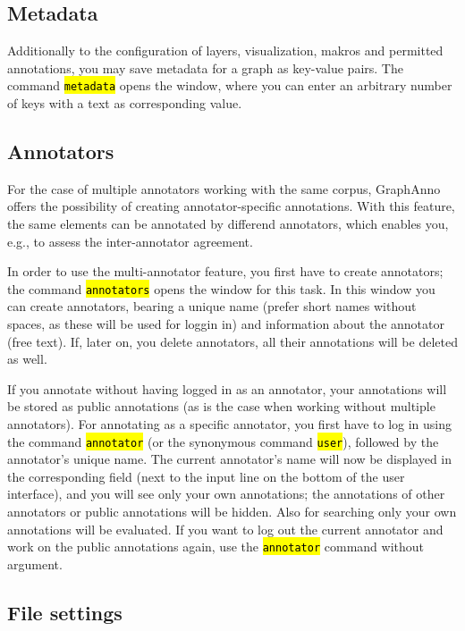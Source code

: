 \documentclass[12pt]{scrartcl}
\newcommand{\code}[1]{\hl{\texttt{#1}}}
\begin{document}
\subsection{Metadata}

Additionally to the configuration of layers, visualization, makros and permitted annotations, you may save metadata for a graph as key-value pairs.
The command \code{metadata} opens the window, where you can enter an arbitrary number of keys with a text as corresponding value.


\subsection{Annotators}\label{annotatoren}

For the case of multiple annotators working with the same corpus, GraphAnno offers the possibility of creating annotator-specific annotations.
With this feature, the same elements can be annotated by differend annotators, which enables you, e.g., to assess the inter-annotator agreement.

In order to use the multi-annotator feature, you first have to create annotators; the command \code{annotators} opens the window for this task.
In this window you can create annotators, bearing a unique name (prefer short names without spaces, as these will be used for loggin in) and information about the annotator (free text).
If, later on, you delete annotators, all their annotations will be deleted as well.

If you annotate without having logged in as an annotator, your annotations will be stored as public annotations (as is the case when working without multiple annotators).
For annotating as a specific annotator, you first have to log in using the command \code{annotator} (or the synonymous command \code{user}), followed by the annotator’s unique name.
The current annotator’s name will now be displayed in the corresponding field (next to the input line on the bottom of the user interface), and you will see only your own annotations; the annotations of other annotators or public annotations will be hidden.
Also for searching only your own annotations will be evaluated.
If you want to log out the current annotator and work on the public annotations again, use the \code{annotator} command without argument.


\subsection{File settings}\label{filesettings}
\end{document}
